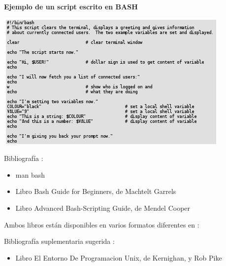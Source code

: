 \documentclass{beamer}
\begin{document}
\begin{frame}{}
\textbf{Ejemplo de un script escrito en BASH }

\begin{center}
 \includegraphics{script2.png}
\end{center}

\end{frame}



\begin{frame}{}
Bibliografía : 
\begin{itemize}
\item man bash
\item Libro Bash Guide for Beginners, de Machtelt Garrels 
\item Libro Advanced Bash-Scripting Guide, de Mendel Cooper
\end{itemize}

Ambos libros están disponibles en varios formatos diferentes en :

Bibliografía suplementaria sugerida : 
\begin{itemize}
\item Libro El Entorno De Programacion Unix, de Kernighan, y Rob Pike
\end{itemize}

\end{frame}
\end{document}
